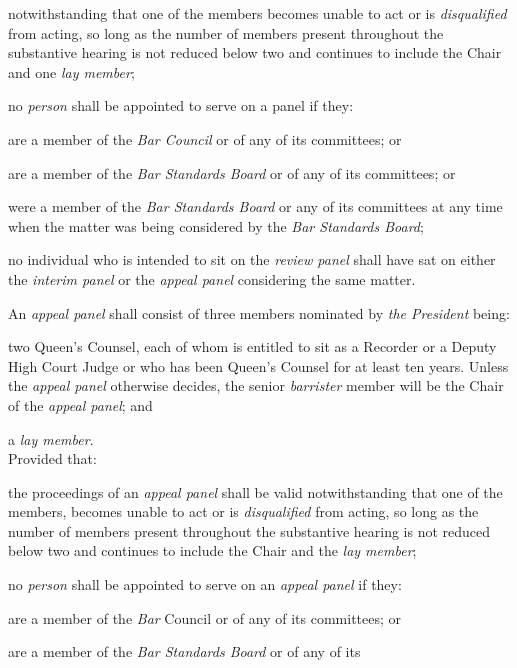 notwithstanding that one of the members becomes unable to act or
is \emph{disqualified} from acting, so long as the number of members
present throughout the substantive hearing is not reduced below two and
continues to include the Chair and one \emph{lay member};\item no \emph{person} shall be appointed to serve on a panel if they:\al
\item are a member of the \emph{Bar Council} or of any of its committees;
or\\
\item are a member of the \emph{Bar Standards Board} or of any of its
committees; or\\
\item were a member of the \emph{Bar Standards Board} or any of its
committees at any time when the matter was being considered by
the \emph{Bar Standards Board};\la\item no individual who is intended to sit on the \emph{review panel} shall
have sat on either the \emph{interim panel} or the \emph{appeal
panel} considering the same matter.\ln
{}\par
An \emph{appeal panel} shall consist of three members nominated
by \emph{the President} being:\\\nl \item two Queen's Counsel, each of whom is entitled to sit as a Recorder or
a Deputy High Court Judge or who has been Queen's Counsel for at least
ten years. Unless the \emph{appeal panel} otherwise decides, the
senior \emph{barrister} member will be the Chair of the \emph{appeal
panel}; and\item a \emph{lay member}.\\
Provided that:\al
\item the proceedings of an \emph{appeal panel} shall be valid
notwithstanding that one of the members, becomes unable to act or
is \emph{disqualified} from acting, so long as the number of members
present throughout the substantive hearing is not reduced below two and
continues to include the Chair and the \emph{lay member};\\
\item no \emph{person} shall be appointed to serve on an \emph{appeal
panel} if they:\rl
\item are a member of the \emph{Bar }Council or of any of its committees;
or\\
\item are a member of the \emph{Bar Standards Board} or of any of its
